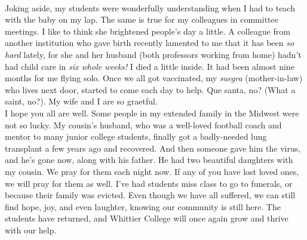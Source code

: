 \documentclass[../../main.tex]{subfiles}
\begin{document}
\\
\vspace{0.15cm}
Joking aside, my students were wonderfully understanding when I had to teach with the baby on my lap.  The same is true for my colleagues in committee meetings.  I like to think she brightened people's day a little.  A colleague from another institution who gave birth recently lamented to me that it has been \textit{so hard} lately, for she and her husband (both professors working from home) hadn't had child care in \textit{six whole weeks!}  I died a little inside.  It had been almost nine months for me flying solo.  Once we all got vaccinated, my \textit{suegra} (mother-in-law) who lives next door, started to come each day to help.  Que santa, no? (What a saint, no?).  My wife and I are so graetful.
\\
\vspace{0.15cm}
I hope you all are well.  Some people in my extended family in the Midwest were not so lucky.  My cousin's husband, who was a well-loved football coach and mentor to many junior college students, finally got a badly-needed lung transplant a few years ago and recovered.  And then someone gave him the virus, and he's gone now, along with his father.  He had two beautiful daughters with my cousin.  We pray for them each night now.  If any of you have lost loved ones, we will pray for them as well.  I've had students miss class to go to funerals, or because their family was evicted.  Even though we have all suffered, we can still find hope, joy, and even laughter, knowing our community is still here.  The students have returned, and Whittier College will once again grow and thrive with our help.
\end{document}
